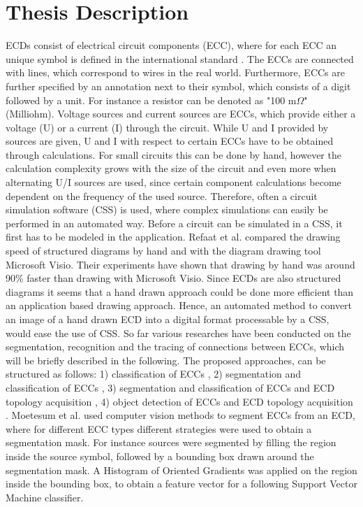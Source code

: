 \documentclass{article} %
\begin{document}
\section*{Thesis Description}
ECDs consist of electrical circuit components (ECC), where for each ECC an unique symbol is defined in the international standard \cite{iec60617}.
The ECCs are connected with lines, which correspond to wires in the real world.
Furthermore, ECCs are further specified by an annotation next to their symbol, which consists of a digit followed by a unit.
For instance a resistor can be denoted as "100 m{$\Omega$}" (Milliohm).
Voltage sources and current sources are ECCs, which provide either a voltage (U) or a current (I) through the circuit.
While U and I provided by sources are given, U and I with respect to certain ECCs have to be obtained through calculations.
For small circuits this can be done by hand, however the calculation complexity grows with the size of the circuit and even more when alternating U/I sources are used, since certain component calculations become dependent on the frequency of the used source.
Therefore, often a circuit simulation software (CSS) is used, where complex simulations can easily be performed in an automated way.
Before a circuit can be simulated in a CSS, it first has to be modeled in the application.
Refaat et al. \cite{ctxindependentsvm} compared the drawing speed of structured diagrams by hand and with the diagram drawing tool Microsoft Visio.
Their experiments have shown that drawing by hand was around 90\% faster than drawing with Microsoft Visio.
Since ECDs are also structured diagrams it seems that a hand drawn approach could be done more efficient than an application based drawing approach.
Hence, an automated method to convert an image of a hand drawn ECD into a digital format processable by a CSS, would ease the use of CSS.
\lf
So far various researches have been conducted on the segmentation, recognition and the tracing of connections between ECCs, which will be briefly described in the following.
The proposed approaches, can be structured as follows:
1) classification of ECCs \cite{anngeo, basecnn, texturesmo},
2) segmentation and classification of ECCs \cite{seghogsvm, fouriersvm},
3) segmentation and classification of ECCs and ECD topology acquisition \cite{knnfull},
4) object detection of ECCs and ECD topology acquisition \cite{yolobool}.
Moetesum et al. \cite{seghogsvm} used computer vision methods to segment ECCs from an ECD, where for different ECC types different strategies were used to obtain a segmentation mask.
For instance sources were segmented by filling the region inside the source symbol, followed by a bounding box drawn around the segmentation mask. A Histogram of Oriented Gradients was applied on the region inside the bounding box, to obtain a feature vector for a following Support Vector Machine classifier.
\end{document}
